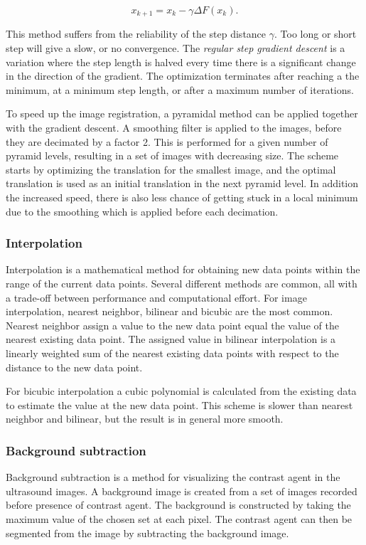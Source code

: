 \begin{equation}
\label{gradient descent}
x_{k+1} = x_k - \gamma \Delta F(x_k).
\end{equation}

This method suffers from the reliability of the step distance $\gamma$. Too long or short step will give a slow, or no convergence. The \textit{regular step gradient descent} is a variation where the step length is halved every time there is a significant change in the direction of the gradient. The optimization terminates after reaching a the minimum, at a minimum step length, or after a maximum number of iterations.

To speed up the image registration, a pyramidal method can be applied together with the gradient descent. A smoothing filter is applied to the images, before they are decimated by a factor 2. This is performed for a given number of pyramid levels, resulting in a set of images with decreasing size. The scheme starts by optimizing the translation for the smallest image, and the optimal translation is used as an initial translation in the next pyramid level. In addition the increased speed, there is also less chance of getting stuck in a local minimum due to the smoothing which is applied before each decimation.
 
\subsubsection{Interpolation}
Interpolation is a mathematical method for obtaining new data points within the range of the current data points. Several different methods are common, all with a trade-off between performance and computational effort. For image interpolation, nearest neighbor, bilinear and bicubic are the most common. Nearest neighbor assign a value to the new data point equal the value of the nearest existing data point. The assigned value in bilinear interpolation is a linearly weighted sum of the nearest existing data points with respect to the distance to the new data point. 

For bicubic interpolation a cubic polynomial is calculated from the existing data to estimate the value at the new data point. This scheme is slower than nearest neighbor and bilinear, but the result is in general more smooth. 

\subsubsection{Background subtraction}
Background subtraction is a method for visualizing the contrast agent in the ultrasound images. A background image is created from a set of images recorded before presence of contrast agent. The background is constructed by taking the maximum value of the chosen set at each pixel. The contrast agent can then be segmented from the image by subtracting the background image. 


